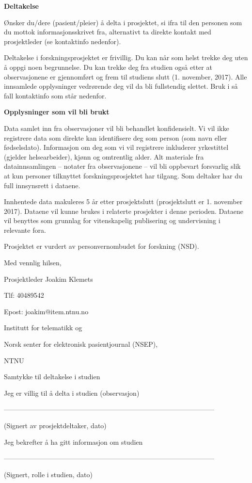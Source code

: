 \noindent
\textbf{Deltakelse}

\noindent
Ønsker du/dere (pasient/pleier) å delta i prosjektet, si ifra til den personen som du mottok informasjonsskrivet fra, alternativt ta direkte kontakt med prosjektleder (se kontaktinfo nedenfor).

\noindent
Deltakelse i forskningsprosjektet er frivillig. Du kan når som helst trekke deg uten å oppgi noen begrunnelse. Du kan trekke deg fra studien også etter at observasjonene er gjennomført og frem til studiens slutt (1. november, 2017). Alle innsamlede opplysninger vedrørende deg vil da bli fullstendig slettet. Bruk i så fall kontaktinfo som står nedenfor.

\noindent
\textbf{Opplysninger som vil bli brukt}

\noindent
Data samlet inn fra observasjoner vil bli behandlet konfidensielt. Vi vil ikke registrere data som direkte kan identifisere deg som person (som navn eller fødselsdato). Informasjon om deg som vi vil registrere inkluderer yrkestittel (gjelder helsearbeider), kjønn og omtrentlig alder. Alt materiale fra datainnsamlingen -- notater fra observasjonene -- vil bli oppbevart forsvarlig slik at kun personer tilknyttet forskningsprosjektet har tilgang. Som deltaker har du full innsynsrett i dataene. 

\noindent
Innhentede data makuleres 5 år etter prosjektslutt (prosjektslutt er 1. november 2017). Dataene vil kunne brukes i relaterte prosjekter i denne perioden. Dataene vil benyttes som grunnlag for vitenskapelig publisering og undervisning i relevante fora.

\noindent
Prosjektet er vurdert av personvernombudet for forskning (NSD).

\noindent
Med vennlig hilsen,                                                                                               

\noindent
Prosjektleder Joakim Klemets

\noindent
Tlf: 40489542

\noindent
Epost: joakim@item.ntnu.no

\noindent
Institutt for telematikk og

\noindent
Norsk senter for elektronisk pasientjournal (NSEP),

\noindent
NTNU

\noindent
Samtykke til deltakelse i studien

\noindent
Jeg er villig til å delta i studien (observasjon)

\noindent
---------------------------------------------------------------------------------------------

\noindent
(Signert av prosjektdeltaker, dato)


\noindent
Jeg bekrefter å ha gitt informasjon om studien


\noindent
---------------------------------------------------------------------------------------------

\noindent
(Signert, rolle i studien, dato)

